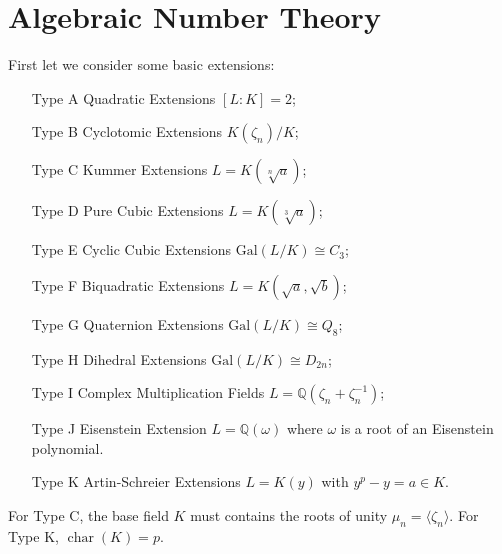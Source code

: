 {\begingroup
\renewcommand{\hom}{\operatorname{Hom}}
\newcommand{\ihom}{\operatorname{\underline{Hom}}}
\newcommand{\tr}{\operatorname{Tr}}
\newcommand{\ol}{\mathcal{O}_L}
\newcommand{\ok}{\mathcal{O}_K}
\newcommand{\ab}{\text{ab}}
\newcommand{\ov}{\mathcal{O}_v}
\newcommand{\cont}{\operatorname{cont}}
\renewcommand{\o}{\mathcal{O}}
\newcommand{\gal}{\operatorname{Gal}}
\newcommand{\dics}{\operatorname{dics}}
\newcommand{\br}{\operatorname{Br}}
\renewcommand{\det}{\operatorname{det}}
\renewcommand{\char}{\operatorname{char}}
\newcommand{\I}{\mathbb{I}}
\newcommand{\F}{\mathbb{F}}
\newcommand{\Q}{\mathbb{Q}}
\newcommand{\R}{\mathbb{R}}
\newcommand{\C}{\mathbb{C}}
\newcommand{\Z}{\mathbb{Z}}
\newcommand{\p}{\mathfrak{p}}
\renewcommand{\d}{\mathfrak{d}}
\newcommand{\D}{\mathfrak{D}}
\renewcommand{\v}{\mathfrak{v}}
\newcommand{\f}{\mathfrak{f}}
\renewcommand{\a}{\mathfrak{a}}
\renewcommand{\b}{\mathfrak{b}}
\renewcommand{\P}{\mathfrak{P}}
\newcommand{\J}{\mathfrak{J}}
\newcommand{\N}{\operatorname{N}}
\newcommand{\Cl}{\operatorname{Cl}}
\newcommand{\legendre}[2]{\genfrac{(}{)}{}{}{#1}{#2}}
\newcommand{\np}{\stepcounter{ant}\noindent\textbf{\arabic{ant}.}\quad}
\newcommand{\prob}{\stepcounter{prob}\noindent\textbf{\arabic{prob}.}\quad}




\chapter{Algebraic Number Theory}
First let we consider some basic extensions:
\begin{itemize}
    \item[Type A] Quadratic Extensions $[L:K]=2$;
    \item[Type B] Cyclotomic Extensions $K(\zeta_n)/K$;
    \item[Type C] Kummer Extensions $L=K(\sqrt[n]{a})$;
    \item[Type D] Pure Cubic Extensions $L=K(\sqrt[3]{a})$;
    \item[Type E] Cyclic Cubic Extensions $\text{Gal}(L/K) \cong C_3$;
    \item[Type F] Biquadratic Extensions $L = K(\sqrt{a}, \sqrt{b})$;
    \item[Type G] Quaternion Extensions $\text{Gal}(L/K) \cong Q_8$;
    \item[Type H] Dihedral Extensions $\text{Gal}(L/K) \cong D_{2n}$;
    \item[Type I] Complex Multiplication Fields $L = \mathbb{Q}(\zeta_n + \zeta_n^{-1})$;
    \item[Type J] Eisenstein Extension $L =  \mathbb{Q}(\omega)$ where $\omega$ is a root of an Eisenstein polynomial.
    \item[Type K] Artin-Schreier Extensions $L = K(y)$ with $y^p - y = a\in K$.
\end{itemize}
For Type C, the base field $K$ must contains the roots of unity $\mu_n=\langle\zeta_n\rangle$.
For Type K, $\char(K)=p$.


}
